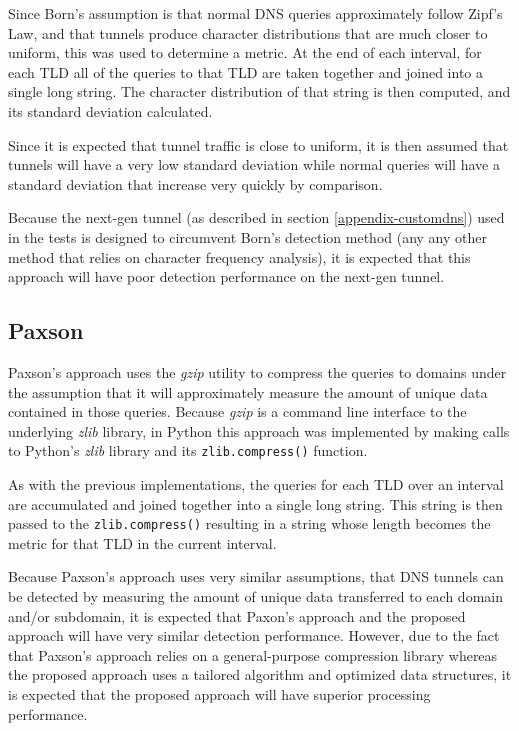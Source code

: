 \documentclass[12pt]{report}
\theoremstyle{remark}
\theoremstyle{definition}
\theoremstyle{definition}
\theoremstyle{definition}
\begin{document}
Since Born's\cite{Born2010.cfa} assumption is that normal DNS queries
approximately follow Zipf's Law, and that tunnels produce character
distributions that are much closer to uniform, this was used to determine a
metric. At the end of each interval, for each TLD all of the queries to that TLD
are taken together and joined into a single long string. The character
distribution of that string is then computed, and its standard deviation
calculated.

Since it is expected that tunnel traffic is close to uniform, it is then assumed
that tunnels will have a very low standard deviation while normal queries will
have a standard deviation that increase very quickly by comparison.

Because the next-gen tunnel (as described in section \ref{appendix-customdns}) used in the tests is designed to circumvent Born's
detection method (any any other method that relies on character frequency
analysis), it is expected that this approach will have poor detection
performance on the next-gen tunnel.

\subsection{Paxson}
Paxson's\cite{Paxson2011} approach uses the \emph{gzip} utility to compress the
queries to domains under the assumption that it will approximately measure the
amount of unique data contained in those queries. Because \emph{gzip} is a
command line interface to the underlying \emph{zlib} library, in Python this
approach was implemented by making calls to Python's \emph{zlib} library and its
\texttt{zlib.compress()} function.

As with the previous implementations, the queries for each TLD over an interval
are accumulated and joined together into a single long string. This string is
then passed to the \texttt{zlib.compress()} resulting in a string whose length
becomes the metric for that TLD in the current interval.

Because Paxson's approach uses very similar assumptions, that DNS tunnels can be
detected by measuring the amount of unique data transferred to each domain
and/or subdomain, it is expected that Paxon's approach and the proposed approach
will have very similar detection performance. However, due to the fact that
Paxson's approach relies on a general-purpose compression library whereas the
proposed approach uses a tailored algorithm and optimized data structures, it is
expected that the proposed approach will have superior processing performance.
\end{document}
